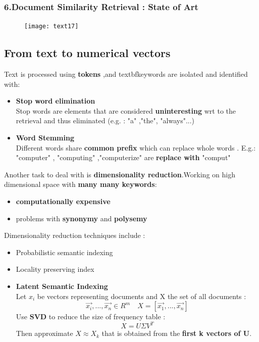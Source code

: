 \subsubsection{6.Document Similarity Retrieval : State of Art}
\begin{figure}[H]
  \centering
  \texttt{[image: text17]}
\end{figure}

\subsection{From text to numerical vectors}
Text is processed using \textbf{tokens} ,and textbf{keywords} are isolated and identified with:
\begin{itemize}
\item  \textbf{Stop word elimination}\\
Stop words are elements that are considered \textbf{uninteresting} wrt to the retrieval and thus eliminated (e.g. : "a" ,"the", "always"...)
\item \textbf{Word Stemming}\\
Different words share \textbf{common prefix} which can replace whole words . E.g.: "computer" , "computing" ,"computerize" are \textbf{replace with} "comput"
\end{itemize}
Another task to deal with is \textbf{dimensionality reduction}.Working on high dimensional space with \textbf{many many keywords}:
\begin{itemize}
\item \textbf{computationally expensive }
\item problems with \textbf{synonymy} and \textbf{polysemy}
\end{itemize}
Dimensionality reduction techniques include :
\begin{itemize}
\item Probabilistic semantic indexing
\item Locality preserving index
\item \textbf{Latent Semantic Indexing}\\
Let $x_i$ be vectors representing documents and X the set of all documents :
$$ \overrightarrow{x_i} ,..., \overrightarrow{x_n} \in R^m \quad X=[\overrightarrow{x_1},...,\overrightarrow{x_n}]$$
Use \textbf{SVD} to reduce the size of frequency table :
 $$ X = U \Sigma V^T$$
 Then approximate $X \approx X_k$ that is obtained from the \textbf{first k vectors of U}.
\end{itemize}

